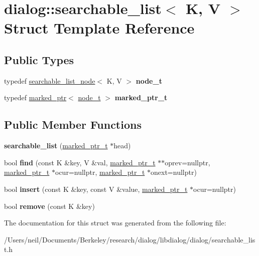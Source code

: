 \hypertarget{structdialog_1_1searchable__list}{}\section{dialog\+:\+:searchable\+\_\+list$<$ K, V $>$ Struct Template Reference}
\label{structdialog_1_1searchable__list}
\subsection*{Public Types}
\begin{DoxyCompactItemize}
\item 
\mbox{\label{structdialog_1_1searchable__list_a8c6ec607042bbdd12957bfd74c1729fe}} 
typedef \hyperlink{structdialog_1_1searchable__list__node}{searchable\+\_\+list\+\_\+node}$<$ K, V $>$ {\bfseries node\+\_\+t}
\item 
\mbox{\label{structdialog_1_1searchable__list_a02fb110f2e6d8572aede1e18c12d3045}} 
typedef \hyperlink{structdialog_1_1marked__ptr}{marked\+\_\+ptr}$<$ \hyperlink{structdialog_1_1searchable__list__node}{node\+\_\+t} $>$ {\bfseries marked\+\_\+ptr\+\_\+t}
\end{DoxyCompactItemize}
\subsection*{Public Member Functions}
\begin{DoxyCompactItemize}
\item 
\mbox{\label{structdialog_1_1searchable__list_a59912d783ee3aa5bc8b4a0d2bc7dae8f}} 
{\bfseries searchable\+\_\+list} (\hyperlink{structdialog_1_1marked__ptr}{marked\+\_\+ptr\+\_\+t} $\ast$head)
\item 
\mbox{\label{structdialog_1_1searchable__list_a0098648b9198cb2e98d7a5417872daa4}} 
bool {\bfseries find} (const K \&key, V \&val, \hyperlink{structdialog_1_1marked__ptr}{marked\+\_\+ptr\+\_\+t} $\ast$$\ast$oprev=nullptr, \hyperlink{structdialog_1_1marked__ptr}{marked\+\_\+ptr\+\_\+t} $\ast$ocur=nullptr, \hyperlink{structdialog_1_1marked__ptr}{marked\+\_\+ptr\+\_\+t} $\ast$onext=nullptr)
\item 
\mbox{\label{structdialog_1_1searchable__list_a7cb6e453e262657ddc642698a92e7e41}} 
bool {\bfseries insert} (const K \&key, const V \&value, \hyperlink{structdialog_1_1marked__ptr}{marked\+\_\+ptr\+\_\+t} $\ast$ocur=nullptr)
\item 
\mbox{\label{structdialog_1_1searchable__list_a971e341de82e4899e0e1e0c1414254a9}} 
bool {\bfseries remove} (const K \&key)
\end{DoxyCompactItemize}


The documentation for this struct was generated from the following file\+:\begin{DoxyCompactItemize}
\item 
/\+Users/neil/\+Documents/\+Berkeley/research/dialog/libdialog/dialog/searchable\+\_\+list.\+h\end{DoxyCompactItemize}
